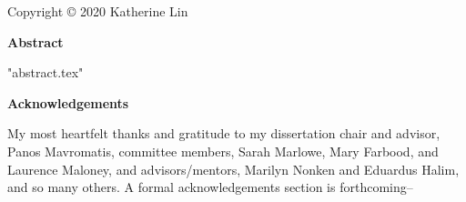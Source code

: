 \documentclass[11pt,letterpaper]{report}
\begin{document}

\newpage
\thispagestyle{empty}
\begin{center}
    Copyright \copyright{} 2020 Katherine Lin
\end{center}



\clearpage
\iftoggle{pretty}
{\singlespacing}
{\doublespacing}
\begin{center}
    \vspace*{0.3in}
    \textbf{Abstract}
\end{center}
 {"abstract.tex"}
\clearpage


\clearpage
{}
\begin{center}
    \vspace*{0.3in}
    \textbf{Acknowledgements}
\end{center}

My most heartfelt thanks and gratitude to my dissertation chair and advisor, Panos Mavromatis, committee members, Sarah Marlowe, Mary Farbood, and Laurence Maloney, and advisors/mentors, Marilyn Nonken and Eduardus Halim, and so many others. A formal acknowledgements section is forthcoming--
\end{document}
